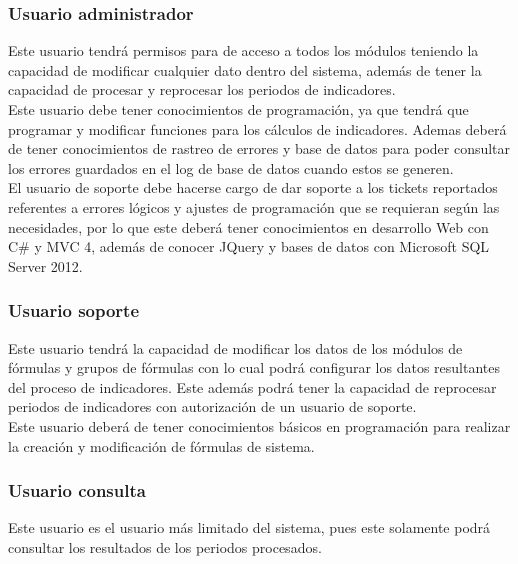 			\subsubsection{Usuario administrador}

				Este usuario tendr\'a permisos para de acceso a todos los m\'odulos teniendo la capacidad de modificar cualquier dato dentro del sistema, adem\'as de tener la capacidad de procesar y reprocesar los periodos de indicadores.\\

				Este usuario debe tener conocimientos de programaci\'on, ya que tendr\'a que programar y modificar funciones para los c\'alculos de indicadores. Ademas deber\'a de tener conocimientos de rastreo de errores y base de datos para poder consultar los errores guardados en el log de base de datos cuando estos se generen. \\

				El usuario de soporte debe hacerse cargo de dar soporte a los tickets reportados referentes a errores l\'ogicos y ajustes de programaci\'on que se requieran seg\'un las necesidades, por lo que este deber\'a tener conocimientos en desarrollo Web con C\# y MVC 4, adem\'as de conocer JQuery y bases de datos con Microsoft SQL Server 2012.\\

			\subsubsection{Usuario soporte}

				Este usuario tendr\'a la capacidad de modificar los datos de los m\'odulos de f\'ormulas y grupos de f\'ormulas con lo cual podr\'a configurar los datos resultantes del proceso de indicadores. Este adem\'as podr\'a tener la capacidad de reprocesar periodos de indicadores con autorizaci\'on de un usuario de soporte.\\

				Este usuario deber\'a de tener conocimientos b\'asicos en programaci\'on para realizar la creaci\'on y modificaci\'on de f\'ormulas de sistema.\\

			\subsubsection{Usuario consulta}
			
				Este usuario es el usuario m\'as limitado del sistema, pues este solamente podr\'a consultar los resultados de los periodos procesados.\\

